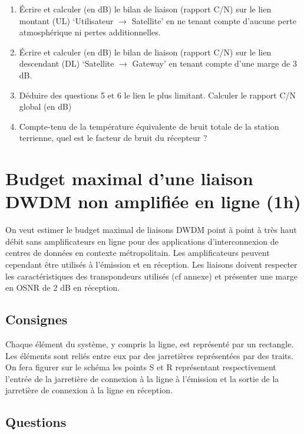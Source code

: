 \documentclass[a4paper,11pt]{article}
\begin{document}
\begin{enumerate}[resume]
    \item Écrire et calculer (en dB) le bilan de liaison (rapport C/N) sur le lien montant (UL) `Utilisateur $\rightarrow$ Satellite' en ne tenant compte d'aucune perte atmosphérique ni pertes additionnelles.
    
    \item Écrire et calculer (en dB) le bilan de liaison (rapport C/N) sur le lien descendant (DL) `Satellite $\rightarrow$ Gateway' en tenant compte d'une marge de 3 dB.
    
    \item Déduire des questions 5 et 6 le lien le plus limitant. Calculer le rapport C/N global (en dB)
    
    \item Compte-tenu de la température équivalente de bruit totale de la station terrienne, quel est le facteur de bruit du récepteur ?
\end{enumerate}

\section{Budget maximal d'une liaison DWDM non amplifiée en ligne (1h)}

On veut estimer le budget maximal de liaisons DWDM point à point à très haut débit sans amplificateurs en ligne pour des applications d'interconnexion de centres de données en contexte métropolitain. Les amplificateurs peuvent cependant être utilisés à l'émission et en réception. Les liaisons doivent respecter les caractéristiques des transpondeurs utilisés (cf annexe) et présenter une marge en OSNR de 2 dB en réception.

\subsection*{Consignes}
Chaque élément du système, y compris la ligne, est représenté par un rectangle. Les éléments sont reliés entre eux par des jarretières représentées par des traits. On fera figurer sur le schéma les points S et R représentant respectivement l'entrée de la jarretière de connexion à la ligne à l'émission et la sortie de la jarretière de connexion à la ligne en réception.

\subsection*{Questions}
\end{document}
